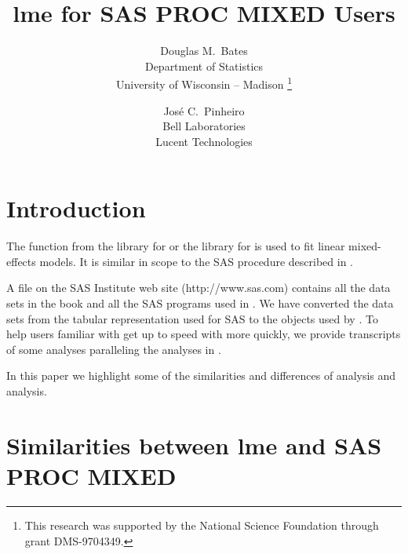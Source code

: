 \documentclass[]{article}
\begin{document}
\title{\textbf{\textsf{lme} for \textsf{SAS PROC MIXED} Users}}
\author{Douglas M.~Bates\smallskip\\
  \textsf{\normalsize Department of Statistics}\\[-0.3ex]
  \textsf{\normalsize University of Wisconsin -- Madison}
  \thanks{This research was supported by the National Science
    Foundation through grant DMS-9704349.}
  \and  Jos\'e C.~Pinheiro\smallskip\\
  \textsf{\normalsize Bell Laboratories}\\[-0.3ex]
  \textsf{\normalsize Lucent Technologies}}
\date{}
\maketitle

\section{Introduction}
\label{sec:intro}

The  function from the  library for \Splus{} or the
 library for \R{} is used to fit linear mixed-effects models.
It is similar in scope to the \textsf{SAS} procedure 
described in .

A file on the SAS Institute web site (\textsf{http://www.sas.com})
contains all the data sets in the book and all the SAS programs used
in .  We have converted the data
sets from the tabular representation used for SAS to the
 objects used by .  To help users familiar
with  get up to speed with  more quickly,
we provide transcripts of some  analyses paralleling the
 analyses in .

In this paper we highlight some of the similarities and differences of
 analysis and  analysis.

\section{Similarities between lme and SAS PROC MIXED}
\label{sec:similarities}
\end{document}
